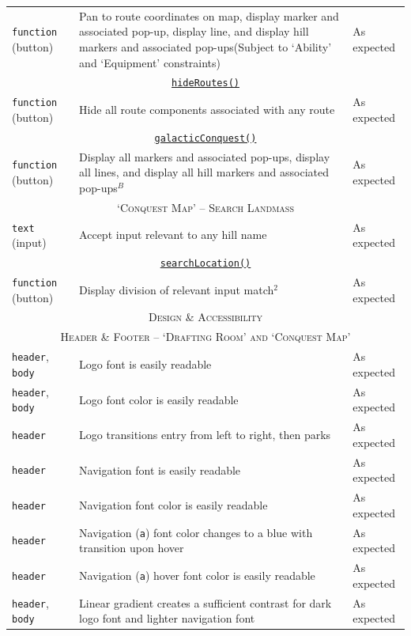 \documentclass[11pt, english]{article}
\begin{document}
\begin{center}
\begin{longtable}{p{3cm}p{8cm}p{2cm}}
		\texttt{function} (button) & Pan to route coordinates on map, display marker and associated pop-up, display line, and display hill markers and associated pop-ups\newline (Subject to `Ability' and `Equipment' constraints) & As expected\\
		\multicolumn{3}{c}{\underline{\texttt{hideRoutes()}}}\\
		\texttt{function} (button) & Hide all route components associated with any route & As expected\\
		\multicolumn{3}{c}{\underline{\texttt{galacticConquest()}}}\\
		\texttt{function} (button) & Display all markers and associated pop-ups, display all lines, and display all hill markers and associated pop-ups$^{B}$ & As expected\\
		\hline
		\multicolumn{3}{c}{\textsc{`Conquest Map' -- Search Landmass}}\\
		\hline
		\texttt{text} (input) & Accept input relevant to any hill name & As expected\\
		\multicolumn{3}{c}{\underline{\texttt{searchLocation()}}}\\
		\texttt{function} (button) & Display division of relevant input match$^{2}$ & As expected\\
		\hline
		\hline
		\multicolumn{3}{c}{\textsc{Design \& Accessibility}}\\
		\hline
		\hline
		\multicolumn{3}{c}{\textsc{Header \& Footer -- `Drafting Room' and `Conquest Map'}}\\
		\hline
		\texttt{header}, \texttt{body} & Logo font is easily readable & As expected\\
		\texttt{header}, \texttt{body} & Logo font color is easily readable & As expected\\
		\texttt{header} & Logo transitions entry from left to right, then parks & As expected\\
		\texttt{header} & Navigation font is easily readable & As expected\\
		\texttt{header} & Navigation font color is easily readable & As expected\\
		\texttt{header} & Navigation (\texttt{a}) font color changes to a blue with transition upon hover & As expected\\
		\texttt{header} & Navigation (\texttt{a}) hover font color is easily readable & As expected\\
		\texttt{header}, \texttt{body} & Linear gradient creates a sufficient contrast for dark logo font and lighter navigation font & As expected\\

\end{longtable}
\end{center}
\end{document}
